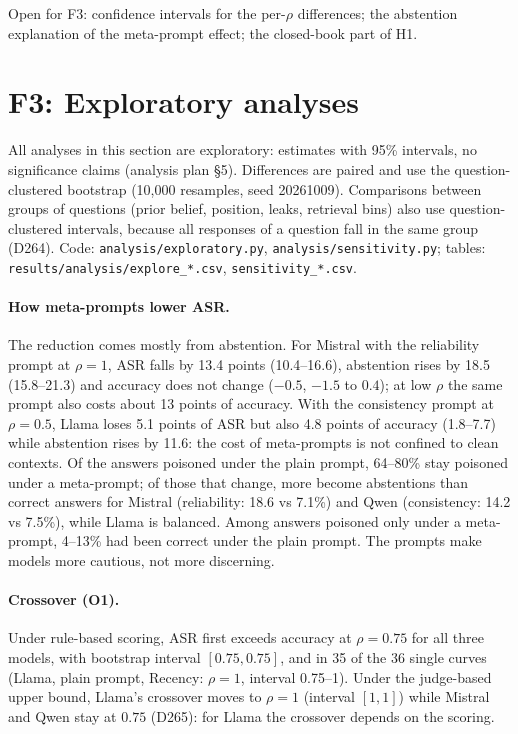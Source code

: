 \documentclass[11pt,a4paper]{report}
\begin{document}
Open for F3: confidence intervals for the per-$\rho$ differences; the abstention explanation of the meta-prompt
effect; the closed-book part of H1.

\section{F3: Exploratory analyses}

All analyses in this section are exploratory: estimates with 95\% intervals, no significance claims
(analysis plan \S5). Differences are paired and use the question-clustered bootstrap (10{,}000 resamples,
seed 20261009). Comparisons between groups of questions (prior belief, position, leaks, retrieval bins)
also use question-clustered intervals, because all responses of a question fall in the same group (D264).
Code: \texttt{analysis/exploratory.py}, \texttt{analysis/sensitivity.py}; tables:
\texttt{results/analysis/explore\_*.csv}, \texttt{sensitivity\_*.csv}.

\paragraph{How meta-prompts lower ASR.} The reduction comes mostly from abstention. For Mistral with the
reliability prompt at $\rho=1$, ASR falls by 13.4 points (10.4--16.6), abstention rises by 18.5 (15.8--21.3)
and accuracy does not change ($-0.5$, $-1.5$ to $0.4$); at low $\rho$ the same prompt also costs about 13
points of accuracy. With the consistency prompt at $\rho=0.5$, Llama loses 5.1 points of ASR but also 4.8
points of accuracy (1.8--7.7) while abstention rises by 11.6: the cost of meta-prompts is not confined to
clean contexts. Of the answers poisoned under the plain prompt, 64--80\% stay poisoned under a meta-prompt;
of those that change, more become abstentions than correct answers for Mistral (reliability: 18.6 vs 7.1\%)
and Qwen (consistency: 14.2 vs 7.5\%), while Llama is balanced. Among answers poisoned only under a
meta-prompt, 4--13\% had been correct under the plain prompt. The prompts make models more cautious,
not more discerning.

\paragraph{Crossover (O1).} Under rule-based scoring, ASR first exceeds accuracy at $\rho=0.75$ for all
three models, with bootstrap interval $[0.75,0.75]$, and in 35 of the 36 single curves (Llama, plain prompt,
Recency: $\rho=1$, interval 0.75--1). Under the judge-based upper bound, Llama's crossover moves to $\rho=1$
(interval $[1,1]$) while Mistral and Qwen stay at $0.75$ (D265): for Llama the crossover depends on the scoring.
\end{document}

